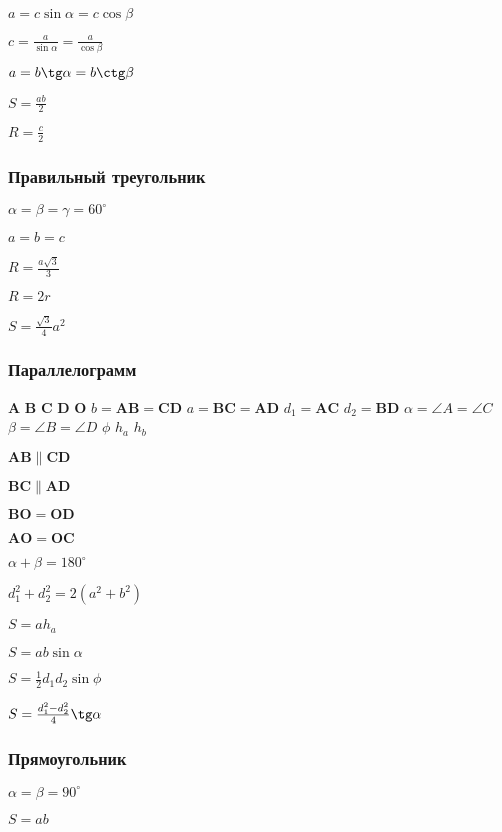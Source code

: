 $ a = c \sin \alpha = c \cos \beta $

$ c = \frac{a}{\sin \alpha} = \frac{a}{\cos \beta} $

$ a = b\tg \alpha = b \ctg \beta $

$ S = \frac{a b}{2} $

$ R = \frac{c}{2} $

\subsubsection{Правильный треугольник}

$ \alpha = \beta = \gamma = 60^{\circ} $

$ a = b = c $

$ R = \frac{a\sqrt{3}}{3} $

$ R = 2r $

$ S = \frac{\sqrt{3}}{4} a^2 $

\subsubsection{Параллелограмм}

$\boldsymbol{A}$
$\boldsymbol{B}$
$\boldsymbol{C}$
$\boldsymbol{D}$
$\boldsymbol{O}$
$b = \boldsymbol{AB} = \boldsymbol{CD}$
$a = \boldsymbol{BC} = \boldsymbol{AD}$
$d_1 = \boldsymbol{AC}$
$d_2 = \boldsymbol{BD}$
$\alpha = \angle A = \angle C$
$\beta = \angle B = \angle D$
$\phi$
$h_a$
$h_b$

$ \boldsymbol{AB} \parallel \boldsymbol{CD} $

$ \boldsymbol{BC} \parallel \boldsymbol{AD} $

$ \boldsymbol{BO} = \boldsymbol{OD} $

$ \boldsymbol{AO} = \boldsymbol{OC} $

$ \alpha + \beta = 180^{\circ} $

$ d_1^2 + d_2^2 = 2(a^2 + b^2) $

$ S = a h_a $

$ S = a b \sin \alpha $

$ S = \frac{1}{2} d_1 d_2 \sin \phi $

$ S = \frac{d_1^2 - d_2^2}{4} \tg \alpha $

\subsubsection{Прямоугольник}

$ \alpha = \beta = 90^{\circ} $

$ S = a b $

